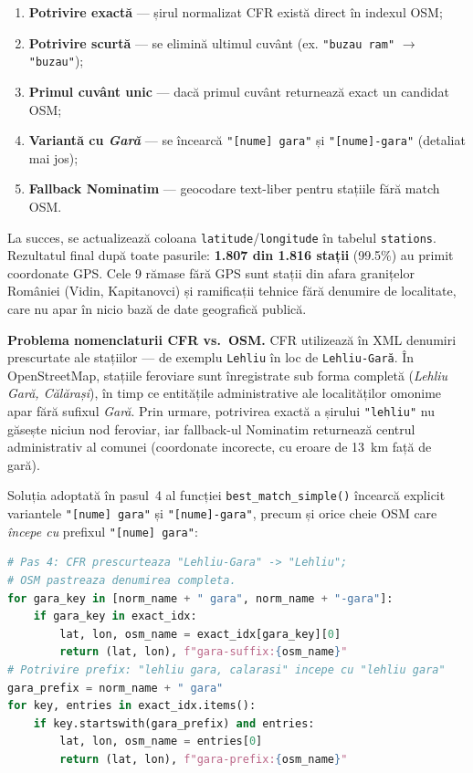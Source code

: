 \documentclass[12pt,a4paper]{report}
\begin{document}
\begin{enumerate}
  \item \textbf{Potrivire exactă} — șirul normalizat CFR există direct în indexul OSM;
  \item \textbf{Potrivire scurtă} — se elimină ultimul cuvânt (ex. \texttt{"buzau ram"} $\to$ \texttt{"buzau"});
  \item \textbf{Primul cuvânt unic} — dacă primul cuvânt returnează exact un candidat OSM;
  \item \textbf{Variantă cu \textit{Gară}} — se încearcă \texttt{"[nume] gara"} și \texttt{"[nume]-gara"} (detaliat mai jos);
  \item \textbf{Fallback Nominatim} — geocodare text-liber pentru stațiile fără match OSM.
\end{enumerate}

La succes, se actualizează coloana \texttt{latitude}/\texttt{longitude} în tabelul \texttt{stations}. Rezultatul final după toate pasurile: \textbf{1.807 din 1.816 stații} (99.5\%) au primit coordonate GPS. Cele 9 rămase fără GPS sunt stații din afara granițelor României (Vidin, Kapitanovci) și ramificații tehnice fără denumire de localitate, care nu apar în nicio bază de date geografică publică.

\textbf{Problema nomenclaturii CFR vs.\ OSM.}
CFR utilizează în XML denumiri prescurtate ale stațiilor --- de exemplu \texttt{Lehliu} în loc de \texttt{Lehliu-Gară}. În OpenStreetMap, stațiile feroviare sunt înregistrate sub forma completă (\textit{Lehliu Gară, Călărași}), în timp ce entitățile administrative ale localităților omonime apar fără sufixul \textit{Gară}. Prin urmare, potrivirea exactă a șirului \texttt{"lehliu"} nu găsește niciun nod feroviar, iar fallback-ul Nominatim returnează centrul administrativ al comunei (coordonate incorecte, cu eroare de 13~km față de gară).

Soluția adoptată în pasul~4 al funcției \texttt{best\_match\_simple()} încearcă explicit variantele \texttt{"[nume] gara"} și \texttt{"[nume]-gara"}, precum și orice cheie OSM care \textit{începe cu} prefixul \texttt{"[nume] gara"}:

\begin{lstlisting}[language=Python, caption=Pasul 4 -- varianta cu sufix Gara pentru statii CFR prescurtate]
# Pas 4: CFR prescurteaza "Lehliu-Gara" -> "Lehliu";
# OSM pastreaza denumirea completa.
for gara_key in [norm_name + " gara", norm_name + "-gara"]:
    if gara_key in exact_idx:
        lat, lon, osm_name = exact_idx[gara_key][0]
        return (lat, lon), f"gara-suffix:{osm_name}"
# Potrivire prefix: "lehliu gara, calarasi" incepe cu "lehliu gara"
gara_prefix = norm_name + " gara"
for key, entries in exact_idx.items():
    if key.startswith(gara_prefix) and entries:
        lat, lon, osm_name = entries[0]
        return (lat, lon), f"gara-prefix:{osm_name}"
\end{lstlisting}
\end{document}
